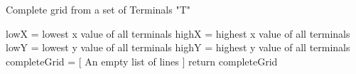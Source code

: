 \begin{algorithm}[H]
\SetAlgoLined
 \caption{Complete grid from a set of Terminals "T"}
 lowX = lowest x value of all terminals\;
 highX = highest x value of all terminals\;
 lowY = lowest y value of all terminals\;
 highY = highest y value of all terminals\;
 completeGrid = [ An empty list of lines ]\;
 return completeGrid\;
\end{algorithm}